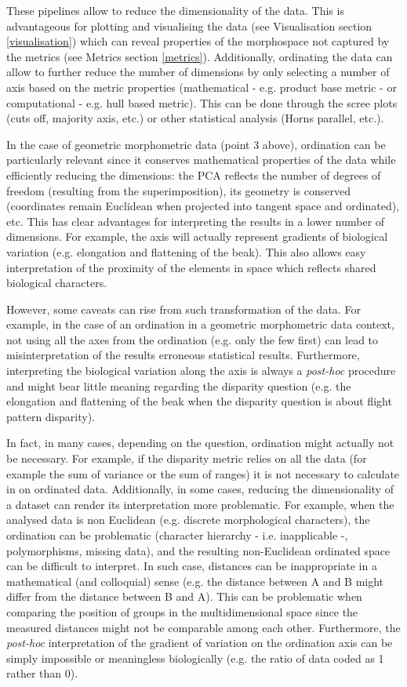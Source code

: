 \documentclass[12pt,letterpaper]{article}
\begin{document}
These pipelines allow to reduce the dimensionality of the data.
This is advantageous for plotting and visualising the data (see Visualisation section \ref{visualisation}) which can reveal properties of the morphospace not captured by the metrics (see Metrics section \ref{metrics}).
Additionally, ordinating the data can allow to further reduce the number of dimensions by only selecting a number of axis based on the metric properties (mathematical - e.g. product base metric - or computational - e.g. hull based metric).
This can be done through the scree plots (cuts off, majority axis, etc.) or other statistical analysis (Horns parallel, etc.).

In the case of geometric morphometric data (point 3 above), ordination can be particularly relevant since it conserves mathematical properties of the data while efficiently reducing the dimensions: the PCA reflects the number of degrees of freedom (resulting from the superimposition), its geometry is conserved (coordinates remain Euclidean when projected into tangent space and ordinated), etc.
This has clear advantages for interpreting the results in a lower number of dimensions.
For example, the axis will actually represent gradients of biological variation (e.g. elongation and flattening of the beak).
This also allows easy interpretation of the proximity of the elements in space which reflects shared biological characters.

However, some caveats can rise from such transformation of the data.
For example, in the case of an ordination in a geometric morphometric data context, not using all the axes from the ordination (e.g. only the few first) can lead to misinterpretation of the results erroneous statistical results.
Furthermore, interpreting the biological variation along the axis is always a \textit{post-hoc} procedure and might bear little meaning regarding the disparity question (e.g. the elongation and flattening of the beak when the disparity question is about flight pattern disparity).

In fact, in many cases, depending on the question, ordination might actually not be necessary.
For example, if the disparity metric relies on all the data (for example the sum of variance or the sum of ranges) it is not necessary to calculate in on ordinated data.
Additionally, in some cases, reducing the dimensionality of a dataset can render its interpretation more problematic.
For example, when the analysed data is non Euclidean (e.g. discrete morphological characters), the ordination can be problematic (character hierarchy - i.e. inapplicable -, polymorphisms, missing data), and the resulting non-Euclidean ordinated space can be difficult to interpret.
In such case, distances can be inappropriate in a mathematical (and colloquial) sense (e.g. the distance between A and B might differ from the distance between B and A).
This can be problematic when comparing the position of groups in the multidimensional space since the measured distances might not be comparable among each other.
Furthermore, the \textit{post-hoc} interpretation of the gradient of variation on the ordination axis can be simply impossible or meaningless biologically (e.g. the ratio of data coded as 1 rather than 0).
\end{document}
